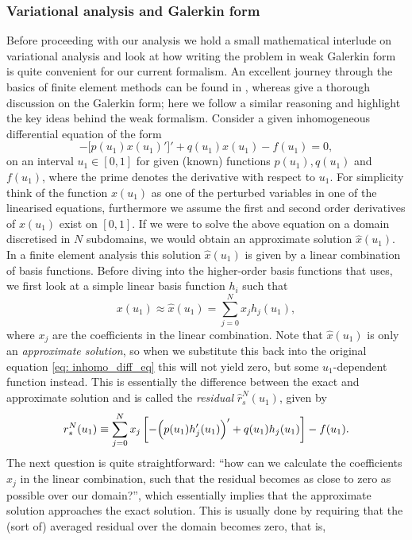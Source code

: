 \subsubsection{Variational analysis and Galerkin form}
Before proceeding with our analysis we hold a small mathematical interlude on variational analysis and look at how writing the problem in weak Galerkin form is quite convenient for our current formalism. An excellent journey through the basics of finite element methods can be found in \citet{book_fem1}, whereas \citet{book_MHD} give a thorough discussion on the Galerkin form; here we follow a similar reasoning and highlight the key ideas behind the weak formalism. Consider a given inhomogeneous differential equation of the form
\begin{equation} \label{eq: inhomo_diff_eq}
  -\bigl[p(u_1)x(u_1)'\bigr]' + q(u_1)x(u_1) - f(u_1) = 0,
\end{equation}
on an interval $u_1 \in [0, 1]$ for given (known) functions $p(u_1), q(u_1)$ and $f(u_1)$, where the prime denotes the derivative with respect to $u_1$. For simplicity think of the function $x(u_1)$ as one of the perturbed variables in one of the linearised equations, furthermore we assume the first and second order derivatives of $x(u_1)$ exist on
$[0, 1]$. If we were to solve the above equation on a domain discretised in $N$ subdomains, we would obtain an approximate solution $\hat{x}(u_1)$. In a finite element analysis this solution $\hat{x}(u_1)$ is given by a linear combination of basis functions. Before diving into the higher-order basis functions that {\legolas} uses, we first look at a simple linear basis function $h_i$ such that
\begin{equation} \label{eq: linear_basisfunctions}
  x(u_1) \approx \hat{x}(u_1) = \sum_{j = 0}^N x_j h_j(u_1),
\end{equation}
where $x_j$ are the coefficients in the linear combination. Note that $\hat{x}(u_1)$ is only an \emph{approximate solution}, so when we substitute this back into the original equation \eqref{eq: inhomo_diff_eq} this will not yield zero, but some $u_1$-dependent function instead. This is essentially the difference between the exact and approximate solution and is called the \emph{residual} $\hat{r}_s^N(u_1)$, given by
\begin{equation} \label{eq: residual}
  r_s^N(u_1) \equiv \sum_{j=0}^N x_j\left[-\Bigl(p(u_1)h_j'(u_1)\Bigr)' + q(u_1)h_j(u_1)\right] - f(u_1).
\end{equation}
The next question is quite straightforward: ``how can we calculate the coefficients $x_j$ in the linear combination, such that the residual becomes as close to zero as possible over our domain?'', which essentially implies that the approximate solution approaches the exact solution. This is usually done by requiring that the (sort of) averaged residual over the domain becomes zero, that is,
